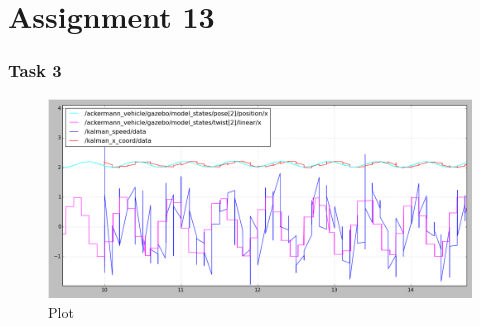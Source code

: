 \chapter{Assignment 13}\label{ass13}

\subsection{Task 3}\label{ass13_t3}

\begin{figure}[!htpb]
\centering
\includegraphics[width=\linewidth]{img/screen_ue13_t3.png}
\caption{Plot}
\label{fig1}
\end{figure}